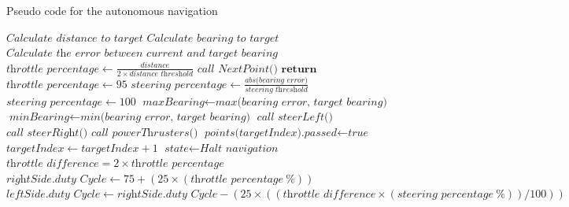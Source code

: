 \begin{algorithm}
	\caption{Pseudo code for the autonomous navigation}
	\label{alg:3:autoNav}
	\begin{algorithmic}[1]
		\State $\textit{Calculate distance to target}$
		\State $\textit{Calculate bearing to target}$
		\State $\textit{Calculate the error between current and target bearing}$
		\State $\textit{throttle percentage} \gets \frac{\textit{distance}}{2 \times \textit{distance threshold}} $
		\State $\textit{call NextPoint()}$
		\State $\textbf{return}$
		\EndIf
		\Else 
		\State $\textit{throttle percentage} \gets 95$
		\EndIf
		\State $\textit{steering percentage} \gets \frac{\textit{abs(bearing error)}}{\textit{steering threshold}}$
		\Else
		\State $\textit{steering percentage} \gets 100$
		\EndIf
		\State $\textit{maxBearing} \gets \textit{max(bearing error, target bearing)}$
		\State $\textit{minBearing} \gets \textit{min(bearing error, target bearing)}$
		\State $\textit{call steerLeft()}$
		\Else
		\State $\textit{call steerRight()}$
		\EndIf
		\State $\textit{call powerThrusters()}$
		\EndProcedure
		\State $\textit{points(targetIndex).passed} \gets \textit{true}$
		\State $\textit{targetIndex} \gets \textit{targetIndex} + 1$
		\State $\textit{state} \gets \textit{Halt navigation}$
		\EndIf
		\EndProcedure
		\State $\textit{throttle difference} = 2 \times \textit{throttle percentage}$
		\State $\textit{rightSide.duty Cycle} \gets 75 + (25 \times (\textit{throttle percentage}\SI{}{\percent}))$
		\State $\textit{leftSide.duty Cycle} \gets \textit{rightSide.duty Cycle} - (25 \times ((\textit{throttle difference} \times (\textit{steering percentage}\SI{}{\percent}))/100))$
		\EndProcedure
	\end{algorithmic}
\end{algorithm}